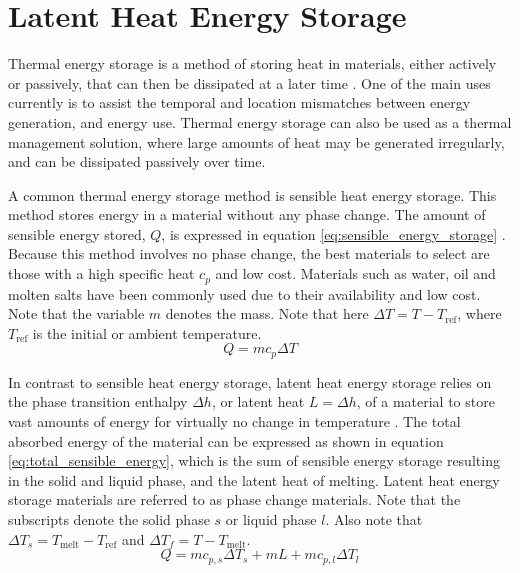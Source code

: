 \section{Latent Heat Energy Storage}
\label{chap:latent_heat_energy_storage}
Thermal energy storage is a method of storing heat in materials, either actively or passively, that can then be dissipated at a later time \cite{Cabeza_Martorell_Miró_Fernández_Barreneche_Cabeza_Fernández_Barreneche_2021}. One of the main uses currently is to assist the temporal and location mismatches between energy generation, and energy use. Thermal energy storage can also be used as a thermal management solution, where large amounts of heat may be generated irregularly, and can be dissipated passively over time.

A common thermal energy storage method is sensible heat energy storage. This method stores energy in a material without any phase change. The amount of sensible energy stored, $Q$, is expressed in equation \ref{eq:sensible_energy_storage} \cite{Cabeza_Martorell_Miró_Fernández_Barreneche_Cabeza_Fernández_Barreneche_2021}. Because this method involves no phase change, the best materials to select are those with a high specific heat $c_p$ and low cost. Materials such as water, oil and molten salts have been commonly used due to their availability and low cost. Note that the variable $m$ denotes the mass. Note that here $\Delta T = T - T_\text{ref}$, where $T_\text{ref}$ is the initial or ambient temperature.
\begin{equation}
    Q = m c_p \Delta T 
    \label{eq:sensible_energy_storage}
\end{equation}

In contrast to sensible heat energy storage, latent heat energy storage relies on the phase transition enthalpy $\Delta h$, or latent heat $L = \Delta h$, of a material to store vast amounts of energy for virtually no change in temperature \cite{Cabeza_Martorell_Miró_Fernández_Barreneche_Cabeza_Fernández_Barreneche_2021}. The total absorbed energy of the material can be expressed as shown in equation \ref{eq:total_sensible_energy}, which is the sum of sensible energy storage resulting in the solid and liquid phase, and the latent heat of melting. Latent heat energy storage materials are referred to as phase change materials. Note that the subscripts denote the solid phase $s$ or liquid phase $l$. Also note that $\Delta T_s = T_\text{melt} - T_\text{ref}$ and $\Delta T_f = T - T_\text{melt}$.
\begin{equation}
    Q = m c_{p,s}\Delta T_s + mL + m c_{p,l}\Delta T_l
    \label{eq:total_sensible_energy}
\end{equation}

